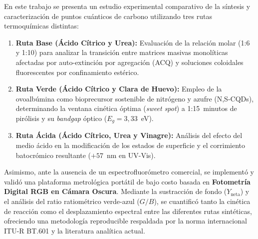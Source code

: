 En este trabajo se presenta un estudio experimental comparativo de la síntesis y caracterización de puntos cuánticos de carbono utilizando tres rutas termoquímicas distintas:
\begin{enumerate}
    \item \textbf{Ruta Base (Ácido Cítrico y Urea):} Evaluación de la relación molar (1:6 y 1:10) para analizar la transición entre matrices masivas monolíticas afectadas por auto-extinción por agregación (ACQ) y soluciones coloidales fluorescentes por confinamiento estérico.
    \item \textbf{Ruta Verde (Ácido Cítrico y Clara de Huevo):} Empleo de la ovoalbúmina como bioprecursor sostenible de nitrógeno y azufre (N,S-CQDs), determinando la ventana cinética óptima (\textit{sweet spot}) a 1:15~minutos de pirólisis y su \textit{bandgap} óptico ($E_g = 3{,}33$~eV).
    \item \textbf{Ruta Ácida (Ácido Cítrico, Urea y Vinagre):} Análisis del efecto del medio ácido en la modificación de los estados de superficie y el corrimiento batocrómico resultante ($+57$~nm en UV-Vis).
\end{enumerate}
Asimismo, ante la ausencia de un espectrofluorómetro comercial, se implementó y validó una plataforma metrológica portátil de bajo costo basada en \textbf{Fotometría Digital RGB en Cámara Oscura}. Mediante la sustracción de fondo ($Y_{\text{neta}}$) y el análisis del ratio ratiométrico verde-azul ($G/B$), se cuantificó tanto la cinética de reacción como el desplazamiento espectral entre las diferentes rutas sintéticas, ofreciendo una metodología reproducible respaldada por la norma internacional ITU-R BT.601 \cite{poynton2012digital} y la literatura analítica actual.